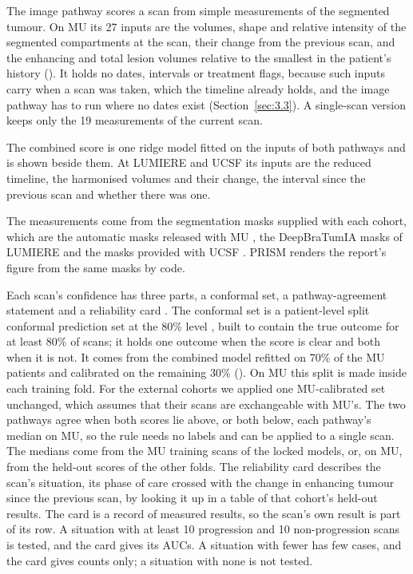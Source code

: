 \documentclass[largeformat]{interact} %
\begin{document}
The image pathway scores a scan from simple measurements of the segmented tumour. On MU its 27 inputs are the
volumes, shape and relative intensity of the segmented compartments at the scan, their change from the previous
scan, and the enhancing and total lesion volumes relative to the smallest in the patient's history
(). It holds no dates,
intervals or treatment flags, because such inputs carry when a scan was taken, which the timeline already holds, and
the image pathway has to run where no dates exist (Section~\ref{sec:3.3}). A single-scan version keeps only the 19
measurements of the current scan.

The combined score is one ridge model fitted on the inputs of both pathways and is shown beside them. At LUMIERE and
UCSF its inputs are the reduced timeline, the harmonised volumes and their change, the interval since the previous
scan and whether there was one.

The measurements come from the segmentation masks supplied with each cohort, which are the automatic masks released with MU
\citep{mahmoud2025}, the DeepBraTumIA masks of LUMIERE \citep{suter2022} and the masks provided with UCSF
\citep{fields2024}. PRISM renders the report's figure from the same masks by code.

Each scan's confidence has three parts, a conformal set, a pathway-agreement statement and a reliability card
\citep{mitchell2019}. The conformal set is a patient-level split conformal prediction set at the 80\% level
\citep{angelopoulos2023}, built to contain the true outcome for at least 80\% of scans; it holds one outcome when
the score is clear and both when it is not. It comes from the combined model refitted on 70\% of the MU patients and calibrated on the remaining 30\%
(). On MU this split is made inside each training fold. For the external
cohorts we applied one MU-calibrated set unchanged, which assumes that their scans are exchangeable with MU's. The two pathways agree when both scores lie
above, or both below, each pathway's median on MU, so the rule needs no labels and can be applied to a single scan. The medians come
from the MU training scans of the locked models, or, on MU, from the held-out scores of the other folds.
The reliability card describes the scan's situation, its phase of care crossed with the change in enhancing tumour
since the previous scan, by looking it up in a table of that cohort's held-out results. The card is a record of measured results, so the
scan's own result is part of its row. A situation with at least 10 progression and 10
non-progression scans is tested, and the card gives its AUCs. A situation with fewer has few cases, and the card
gives counts only; a situation with none is not tested.
\end{document}
